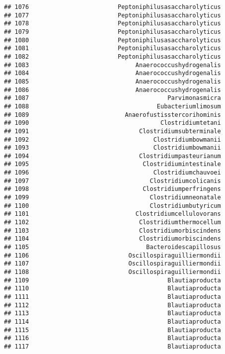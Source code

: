\documentclass[
]{article}
\begin{document}
\begin{verbatim}
## 1076                         Peptoniphilusasaccharolyticus
## 1077                         Peptoniphilusasaccharolyticus
## 1078                         Peptoniphilusasaccharolyticus
## 1079                         Peptoniphilusasaccharolyticus
## 1080                         Peptoniphilusasaccharolyticus
## 1081                         Peptoniphilusasaccharolyticus
## 1082                         Peptoniphilusasaccharolyticus
## 1083                              Anaerococcushydrogenalis
## 1084                              Anaerococcushydrogenalis
## 1085                              Anaerococcushydrogenalis
## 1086                              Anaerococcushydrogenalis
## 1087                                       Parvimonasmicra
## 1088                                    Eubacteriumlimosum
## 1089                           Anaerofustisstercorihominis
## 1090                                     Clostridiumtetani
## 1091                               Clostridiumsubterminale
## 1092                                   Clostridiumbowmanii
## 1093                                   Clostridiumbowmanii
## 1094                               Clostridiumpasteurianum
## 1095                                Clostridiumintestinale
## 1096                                   Clostridiumchauvoei
## 1097                                  Clostridiumcolicanis
## 1098                                Clostridiumperfringens
## 1099                                  Clostridiumneonatale
## 1100                                  Clostridiumbutyricum
## 1101                              Clostridiumcellulovorans
## 1102                               Clostridiumthermocellum
## 1103                               Clostridiumorbiscindens
## 1104                               Clostridiumorbiscindens
## 1105                                 Bacteroidescapillosus
## 1106                            Oscillospiraguilliermondii
## 1107                            Oscillospiraguilliermondii
## 1108                            Oscillospiraguilliermondii
## 1109                                       Blautiaproducta
## 1110                                       Blautiaproducta
## 1111                                       Blautiaproducta
## 1112                                       Blautiaproducta
## 1113                                       Blautiaproducta
## 1114                                       Blautiaproducta
## 1115                                       Blautiaproducta
## 1116                                       Blautiaproducta
## 1117                                       Blautiaproducta

\end{verbatim}
\end{document}
